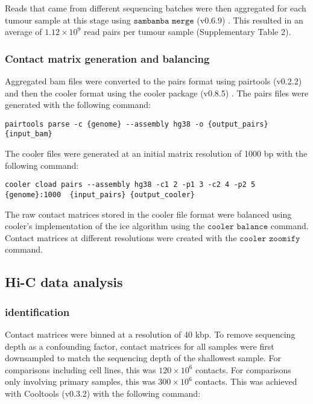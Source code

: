 Reads that came from different sequencing batches were then aggregated for each tumour sample at this stage using $\texttt{sambamba merge}$ (v0.6.9) \cite{tarasovSambambaFastProcessing2015}.
This resulted in an average of $1.12 \times 10^9$ read pairs per tumour sample (Supplementary Table 2).

\subsubsection{Contact matrix generation and balancing}

Aggregated \gls{bam} files were converted to the pairs format using pairtools (v0.2.2) \cite{goloborodkoMirnylabPairtoolsV02019} and then the cooler format using the cooler package (v0.8.5) \cite{abdennurCoolerScalableStorage2020}.
The pairs files were generated with the following command:

\begin{lstlisting}[basicstyle=\ttfamily]
pairtools parse -c {genome} --assembly hg38 -o {output_pairs} {input_bam}
\end{lstlisting}

The cooler files were generated at an initial matrix resolution of 1000 bp with the following command:

\begin{lstlisting}[basicstyle=\ttfamily]
cooler cload pairs --assembly hg38 -c1 2 -p1 3 -c2 4 -p2 5 {genome}:1000  {input_pairs} {output_cooler}
\end{lstlisting}

The raw contact matrices stored in the cooler file format were balanced using cooler's implementation of the \gls{ice} algorithm \cite{imakaevIterativeCorrectionHiC2012} using the $\texttt{cooler balance}$ command.
Contact matrices at different resolutions were created with the $\texttt{cooler zoomify}$ command.

\subsection{Hi-C data analysis}

\subsubsection{ identification}

Contact matrices were binned at a resolution of 40 kbp.
To remove sequencing depth as a confounding factor, contact matrices for all samples were first downsampled to match the sequencing depth of the shallowest sample.
For comparisons including cell lines, this was $120 \times 10^6$ contacts.
For comparisons only involving primary samples, this was $300 \times 10^6$ contacts.
This was achieved with Cooltools (v0.3.2) \cite{venevMirnylabCooltoolsV02020} with the following command:

